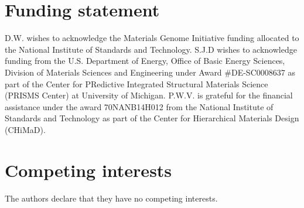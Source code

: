 \documentclass{jors}
\begin{document}
\section*{Funding statement}

D.W. wishes to acknowledge the Materials Genome Initiative funding
allocated to the National Institute of Standards and Technology. S.J.D
wishes to acknowledge funding from the U.S. Department of Energy,
Office of Basic Energy Sciences, Division of Materials Sciences and
Engineering under Award \#DE-SC0008637 as part of the Center for
PRedictive Integrated Structural Materials Science (PRISMS Center) at
University of Michigan. P.W.V. is grateful for the financial
assistance under the award 70NANB14H012 from the National Institute of
Standards and Technology as part of the Center for Hierarchical
Materials Design (CHiMaD).

\section*{Competing interests}

The authors declare that they have no competing interests.

\printbibliography
\end{document}
